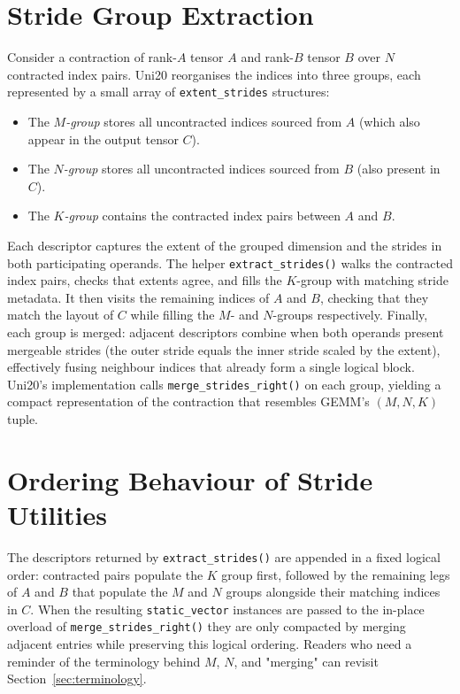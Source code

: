 \documentclass[11pt]{article}
\begin{document}
\section{Stride Group Extraction}
Consider a contraction of rank-$A$ tensor $A$ and rank-$B$ tensor $B$ over $N$ contracted index
pairs.  Uni20 reorganises the indices into three groups, each represented by a small array of
\texttt{extent\_strides} structures:
\begin{itemize}
  \item The \emph{$M$-group} stores all uncontracted indices sourced from $A$ (which also appear in
        the output tensor $C$).
  \item The \emph{$N$-group} stores all uncontracted indices sourced from $B$ (also present in $C$).
  \item The \emph{$K$-group} contains the contracted index pairs between $A$ and $B$.
\end{itemize}
Each descriptor captures the extent of the grouped dimension and the strides in both participating
operands.  The helper \texttt{extract\_strides()} walks the contracted index pairs, checks that
extents agree, and fills the $K$-group with matching stride metadata.  It then visits the remaining
indices of $A$ and $B$, checking that they match the layout of $C$ while filling the $M$- and
$N$-groups respectively.  Finally, each group is merged: adjacent descriptors combine when both
operands present mergeable strides (the outer stride equals the inner stride scaled by the extent),
effectively fusing neighbour indices that already form a single logical block.  Uni20's implementation
calls \texttt{merge\_strides\_right()} on each group, yielding a compact representation of the
contraction that resembles GEMM's $(M,N,K)$ tuple.

\section{Ordering Behaviour of Stride Utilities}\label{sec:merge-order}
The descriptors returned by \texttt{extract\_strides()} are appended in a fixed logical order:
contracted pairs populate the $K$ group first, followed by the remaining legs of $A$ and $B$ that
populate the $M$ and $N$ groups alongside their matching indices in $C$.  When the resulting
\texttt{static\_vector} instances are passed to the in-place overload of
\texttt{merge\_strides\_right()} they are only compacted by merging adjacent entries while
preserving this logical ordering.  Readers who need a reminder of the terminology behind $M$, $N$, and
"merging" can revisit Section~\ref{sec:terminology}.
\end{document}
